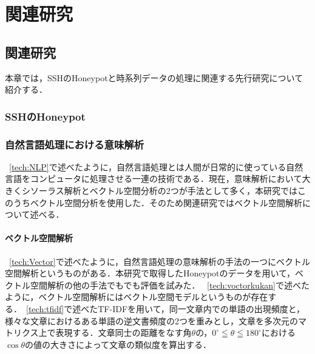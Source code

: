 \chapter{関連研究}
 \label{rela}

\section{関連研究}
本章では，SSHのHoneypotと時系列データの処理に関連する先行研究について紹介する．
\subsection{SSHのHoneypot}
\subsection{自然言語処理における意味解析}
~\ref{tech:NLP}で述べたように，自然言語処理とは人間が日常的に使っている自然言語をコンピュータに処理させる一連の技術である．現在，意味解析において大きくシソーラス解析とベクトル空間分析の2つが手法として多く，本研究ではこのうちベクトル空間分析を使用した．そのため関連研究ではベクトル空間解析について述べる．
\subsubsection{ベクトル空間解析}
~\ref{tech:Vector}で述べたように，自然言語処理の意味解析の手法の一つにベクトル空間解析というものがある．本研究で取得したHoneypotのデータを用いて，ベクトル空間解析の他の手法でもでも評価を試みた．
~\ref{tech:voctorkukan}で述べたように，ベクトル空間解析にはベクトル空間モデルというものが存在する．~\ref{tech:tfidf}で述べたTF-IDFを用いて，同一文章内での単語の出現頻度と，様々な文章におけるある単語の逆文書頻度の2つを重みとし，文章を多次元のマトリクス上で表現する．文章同士の距離をなす角$ \theta $の，$ 0^\circ \leqq \theta \leqq 180^\circ $における$ \cos \theta $の値の大きさによって文章の類似度を算出する．


